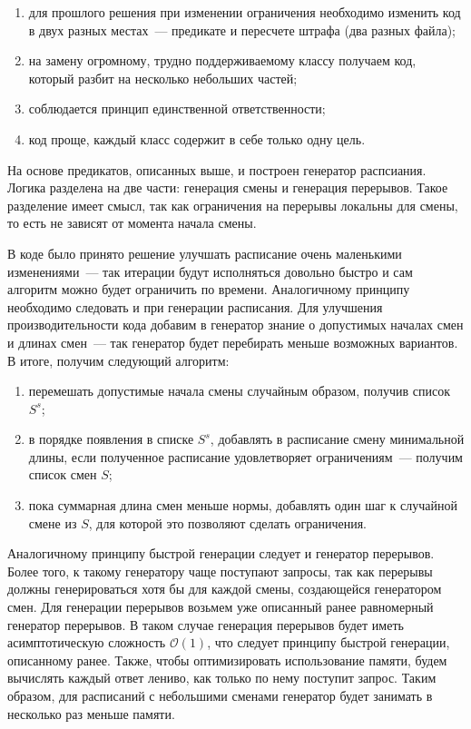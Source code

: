 \documentclass[times,specification,annotation]{itmo-student-thesis}
\begin{document}
\begin{enumerate}
    \item для прошлого решения при изменении ограничения необходимо изменить код в двух разных местах~--- предикате и пересчете штрафа (два разных файла);
    \item на замену огромному, трудно поддерживаемому классу получаем код, который разбит на несколько небольших частей;
    \item соблюдается принцип единственной ответственности;
    \item код проще, каждый класс содержит в себе только одну цель.
\end{enumerate}

На основе предикатов, описанных выше, и построен генератор распсиания.
Логика разделена на две части: генерация смены и генерация перерывов.
Такое разделение имеет смысл, так как ограничения на перерывы локальны для смены, то есть не зависят от момента начала смены.

В коде было принято решение улучшать расписание очень маленькими изменениями~--- так итерации будут исполняться довольно быстро и сам алгоритм можно будет ограничить по времени.
Аналогичному принципу необходимо следовать и при генерации расписания.
Для улучшения производительности кода добавим в генератор знание о допустимых началах смен и длинах смен~--- так генератор будет перебирать меньше возможных вариантов.
В итоге, получим следующий алгоритм:

\begin{enumerate}
    \item перемешать допустимые начала смены случайным образом, получив список $S^s$;
    \item в порядке появления в списке $S^s$, добавлять в расписание смену минимальной длины, если полученное расписание удовлетворяет ограничениям~--- получим список смен $S$;
    \item пока суммарная длина смен меньше нормы, добавлять один шаг к случайной смене из $S$, для которой это позволяют сделать ограничения.
\end{enumerate}

Аналогичному принципу быстрой генерации следует и генератор перерывов.
Более того, к такому генератору чаще поступают запросы, так как перерывы должны генерироваться хотя бы для каждой смены, создающейся генератором смен.
Для генерации перерывов возьмем уже описанный ранее равномерный генератор перерывов.
В таком случае генерация перерывов будет иметь асимптотическую сложность $\mathcal{O}(1)$, что следует принципу быстрой генерации, описанному ранее.
Также, чтобы оптимизировать использование памяти, будем вычислять каждый ответ лениво, как только по нему поступит запрос.
Таким образом, для расписаний с небольшими сменами генератор будет занимать в несколько раз меньше памяти.
\end{document}
